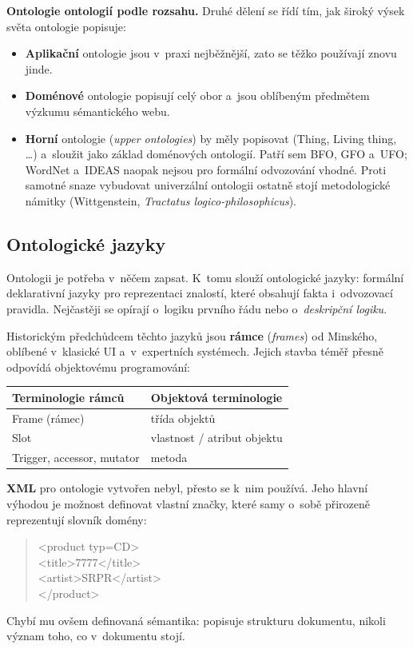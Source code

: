 \documentclass[11pt,a4paper]{article}
\theoremstyle{definition}
\begin{document}
\textbf{Ontologie ontologií podle rozsahu.} Druhé dělení se řídí tím, jak široký výsek světa
ontologie popisuje:
\begin{itemize}
\item \textbf{Aplikační} ontologie jsou v~praxi nejběžnější, zato se těžko používají znovu jinde.
\item \textbf{Doménové} ontologie popisují celý obor a~jsou oblíbeným předmětem výzkumu
  sémantického webu.
\item \textbf{Horní} ontologie (\emph{upper ontologies}) by měly popisovat 
  (Thing, Living thing, \dots) a~sloužit jako základ doménových ontologií. Patří sem BFO, GFO
  a~UFO; WordNet a~IDEAS naopak nejsou pro formální odvozování vhodné. Proti samotné snaze
  vybudovat univerzální ontologii ostatně stojí metodologické námitky
  (Wittgenstein, \emph{Tractatus logico-philosophicus}).
\end{itemize}

\subsection{Ontologické jazyky}

Ontologii je potřeba v~něčem zapsat. K~tomu slouží ontologické jazyky: formální deklarativní
jazyky pro reprezentaci znalostí, které obsahují fakta i~odvozovací pravidla. Nejčastěji se
opírají o~logiku prvního řádu nebo o~\emph{deskripční logiku}.

Historickým předchůdcem těchto jazyků jsou \textbf{rámce} (\emph{frames}) od Minského, oblíbené
v~klasické UI a~v~expertních systémech. Jejich stavba téměř přesně odpovídá objektovému
programování:

\begin{center}\small
\begin{tabular}{ll}
\toprule
\textbf{Terminologie rámců} & \textbf{Objektová terminologie} \\
\midrule
Frame (rámec) & třída objektů \\
Slot & vlastnost / atribut objektu \\
Trigger, accessor, mutator & metoda \\
\bottomrule
\end{tabular}
\end{center}

\textbf{XML} pro ontologie vytvořen nebyl, přesto se k~nim používá. Jeho hlavní výhodou je
možnost definovat vlastní značky, které samy o~sobě přirozeně reprezentují slovník domény:
\begin{quote}\small\ttfamily
<product typ=\textquotedbl CD\textquotedbl>\\
\hspace*{1em}<title>7777</title>\\
\hspace*{1em}<artist>SRPR</artist>\\
</product>
\end{quote}
Chybí mu ovšem definovaná sémantika: popisuje strukturu dokumentu, nikoli význam toho, co
v~dokumentu stojí.
\end{document}
